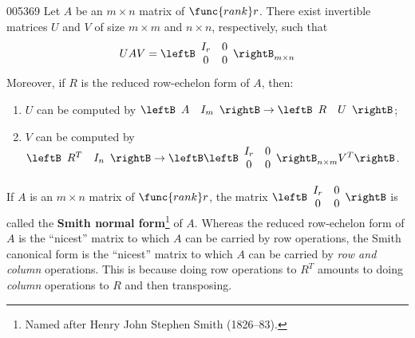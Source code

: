 \begin{theorem}{}{005369}
Let $A$ be an $m \times n$ matrix of $\func{rank }r$. There exist invertible matrices $U$ and $V$ of size $m \times m$ and $n \times n$, respectively, such that
\begin{equation*}
UAV = \leftB \begin{array}{cc}
I_{r} & 0 \\
0 & 0
\end{array} \rightB_{m \times n}
\end{equation*}
Moreover, if $R$ is the reduced row-echelon form of $A$, then:

\begin{enumerate}
\item $U$ can be computed by $\leftB \begin{array}{cc}
A & I_{m}
\end{array} \rightB \rightarrow \leftB \begin{array}{cc}
R & U
\end{array} \rightB$;

\item $V$ can be computed by $\leftB \begin{array}{cc}
R^{T} & I_{n}
\end{array} \rightB \rightarrow \leftB \leftB \begin{array}{cc}
I_{r} & 0 \\
0 & 0
\end{array} \rightB_{n \times m} V^{T} \rightB$.

\end{enumerate}
\end{theorem}

If $A$ is an $m \times n$ matrix of $\func{rank }r$, the matrix 
$\leftB \begin{array}{cc}
I_{r} & 0 \\
0 & 0
\end{array} \rightB$
 is called the \textbf{Smith normal form}\footnote{Named after Henry John Stephen Smith (1826--83).} of $A$. Whereas the reduced row-echelon form of $A$ is the ``nicest'' matrix to which $A$ can be carried by row operations, the Smith canonical form is the ``nicest'' matrix to which $A$ can be carried by \textit{row and column} operations. This is because doing row operations to $R^{T}$ amounts to doing \textit{column} operations to $R$ and then transposing.

